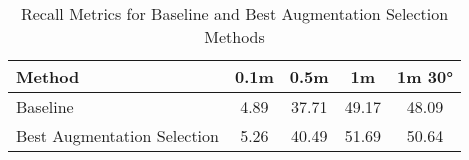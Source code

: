 
\begin{table}[ht]
    \centering
    \begin{tabular}{lcccc}
        \hline
        \textbf{Method} & \textbf{0.1m} & \textbf{0.5m} & \textbf{1m} & \textbf{1m 30°} \\
        \hline

    Baseline & 4.89 & 37.71 & 49.17 & 48.09 \\
    Best Augmentation Selection & 5.26 & 40.49 & 51.69 & 50.64 \\
        \hline
    \end{tabular}
    \caption{Recall Metrics for Baseline and Best Augmentation Selection Methods}
    \label{tab:recall_metrics}
\end{table}

